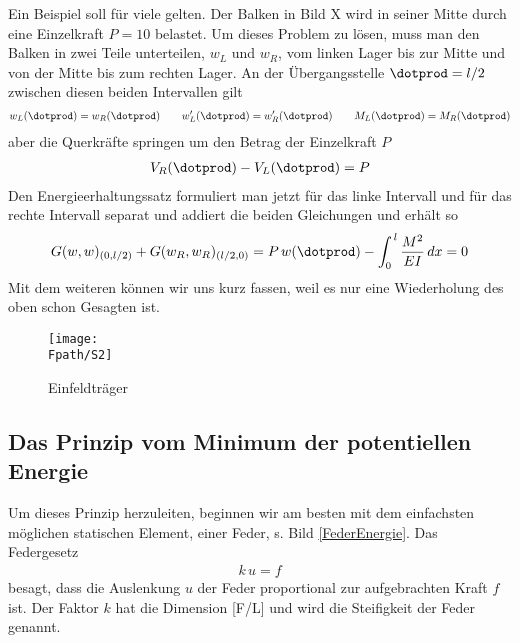Ein Beispiel soll f\"{u}r viele gelten. Der Balken in Bild X wird in seiner Mitte durch eine Einzelkraft $ P = 10 $ belastet. Um dieses Problem zu l\"{o}sen, muss man den Balken in zwei Teile unterteilen, $w_L$ und $w_R$, vom linken Lager bis zur Mitte und von der Mitte bis zum rechten Lager. An der \"{U}bergangsstelle $\dotprod = l/2$ zwischen diesen beiden Intervallen gilt
\begin{align}
w_L(\dotprod) = w_R(\dotprod) \qquad w_L'(\dotprod) = w_R'(\dotprod) \qquad M_L(\dotprod) = M_R(\dotprod)
\end{align}
aber die Querkr\"{a}fte springen um den Betrag der Einzelkraft $P$
\begin{align}
V_R(\dotprod ) - V_L(\dotprod ) = P
\end{align}
Den Energieerhaltungssatz formuliert man jetzt f\"{u}r das linke Intervall und f\"{u}r das rechte Intervall separat und addiert die beiden Gleichungen und erh\"{a}lt so
\begin{align}
G(w,w)_{(0,l/2)} + G(w_R,w_R)_{(l/2, 0) } = P \,w(\dotprod) - \int_0^{\,l} \frac{M^2}{EI}\,dx = 0
\end{align}
Mit dem weiteren k\"{o}nnen wir uns kurz fassen, weil es nur eine Wiederholung des oben schon Gesagten ist.


\begin{figure}[tbp]
\centering
\if {} \sidecaption \fi
\texttt{[image: \\Fpath/S2]}
\caption{Einfeldtr\"{a}ger} \label{S2}
%
\end{figure}%

%

\subsection{Das Prinzip vom Minimum der potentiellen Energie}

Um dieses Prinzip herzuleiten, beginnen wir am besten mit dem einfachsten m\"{o}glichen statischen Element, einer Feder, s. Bild \ref{FederEnergie}.
Das Federgesetz
\begin{align}
k\,u = f
\end{align}
besagt, dass die Auslenkung $ u $ der Feder proportional zur aufgebrachten Kraft $ f $ ist. Der Faktor $ k $ hat die Dimension [F/L] und wird die Steifigkeit der Feder genannt.

